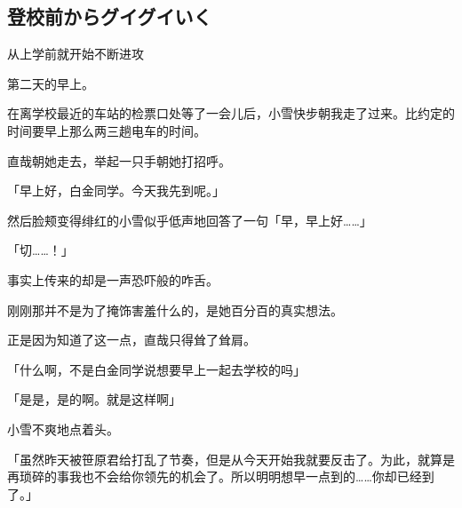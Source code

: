 \subsection{登校前からグイグイいく}
从上学前就开始不断进攻

第二天的早上。

在离学校最近的车站的检票口处等了一会儿后，小雪快步朝我走了过来。比约定的时间要早上那么两三趟电车的时间。

直哉朝她走去，举起一只手朝她打招呼。

「早上好，白金同学。今天我先到呢。」

然后脸颊变得绯红的小雪似乎低声地回答了一句「早，早上好……」

「切……！」

事实上传来的却是一声恐吓般的咋舌。

刚刚那并不是为了掩饰害羞什么的，是她百分百的真实想法。

正是因为知道了这一点，直哉只得耸了耸肩。

「什么啊，不是白金同学说想要早上一起去学校的吗」

「是是，是的啊。就是这样啊」

小雪不爽地点着头。

「虽然昨天被笹原君给打乱了节奏，但是从今天开始我就要反击了。为此，就算是再琐碎的事我也不会给你领先的机会了。所以明明想早一点到的……你却已经到了。」

